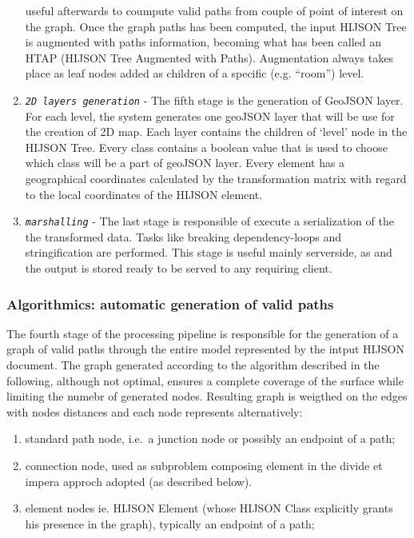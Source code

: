 \documentclass{sig-alternate}
\begin{document}
\begin{enumerate}
 useful afterwards to coumpute valid paths from couple of point of
 interest on the graph. Once the graph paths has been computed, the
 input HIJSON Tree is augmented with paths information, becoming what
 has been called an HTAP (HIJSON Tree Augmented with Paths).
 Augmentation always takes place as leaf nodes added as children of a
 specific (e.g. ``room'') level.
\item
 \textit{\texttt{2D layers generation}} - The fifth stage is the
 generation of GeoJSON layer. For each level, the system generates one
 geoJSON layer that will be use for the creation of 2D map. Each layer
 contains the children of `level' node in the HIJSON Tree. Every class
 contains a boolean value that is used to choose which class will be a
 part of geoJSON layer. Every element has a geographical coordinates
 calculated by the transformation matrix with regard to the local
 coordinates of the HIJSON element.
\item
 \textit{\texttt{marshalling}} - The last stage is responsible of execute
 a serialization of the the transformed data. Tasks like breaking
 dependency-loops and stringification are performed. This stage is
 useful mainly serverside, as and the output is stored ready to be
 served to any requiring client.
\end{enumerate}

\subsubsection{Algorithmics: automatic generation of valid paths}\label{algorithmics-automatic-generation-of-valid-paths}

The fourth stage of the processing pipeline is responsible for the
generation of a graph of valid paths through the entire model
represented by the intput HIJSON document. The graph generated according
to the algorithm described in the following, although not optimal,
ensures a complete coverage of the surface while limiting the numebr of
generated nodes. Resulting graph is weigthed on the edges with nodes
distances and each node represents alternatively:

\begin{enumerate}
\def\labelenumi{\alph{enumi}.}
\itemsep1pt\parskip0pt
\item
 standard path node, i.e.~a junction node or possibly an endpoint of a
 path;
\item
 connection node, used as subproblem composing element in the divide et
 impera approch adopted (as described below).
\item
 element nodes ie. HIJSON Element (whose HIJSON Class explicitly grants
 his presence in the graph), typically an endpoint of a path;
\end{enumerate}
\end{document}
